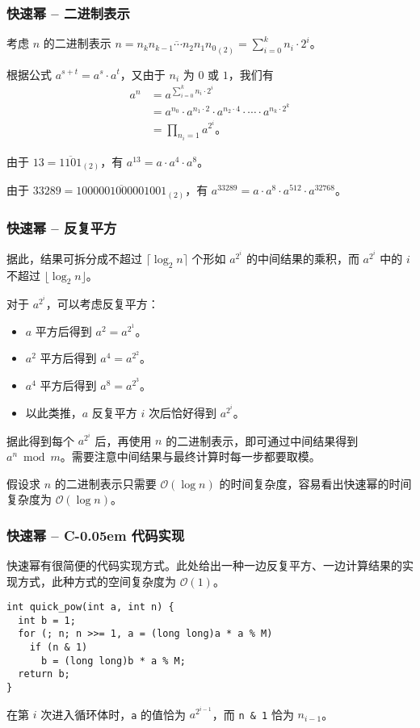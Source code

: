 \documentclass{../pkslide}
\newcommand{\Cpp}{\texorpdfstring{C\kern-0.05em\protect\raisebox{.35ex}{\textsmaller[2]{+\kern-0.05em+}}}{C++}}
\begin{document}
\begin{frame}
  \frametitle{快速幂 -- 二进制表示}
  考虑 $n$ 的二进制表示 $n = \overline{n_k n_{k - 1} \cdots n_2 n_1 n_0}_{(2)} = \sum_{i = 0}^{k} n_i \cdot 2^i$。
  
  \pause
  根据公式 $a^{s + t} = a^s \cdot a^t$，又由于 $n_i$ 为 $0$ 或 $1$，我们有
  \begin{align*}
    a^n &= a^{\sum_{i = 0}^{k} n_i \cdot 2^i} \\
    &= a^{n_0} \cdot a^{n_1 \cdot 2} \cdot a^{n_2 \cdot 4} \cdot \cdots \cdot a^{n_k \cdot 2^k} \\
    &= \prod_{n_i = 1} a^{2^i} \text{。}
  \end{align*}
  
  \pause
  \begin{example}
    由于 $13 = \overline{1101}_{(2)}$，有 $a^{13} = a \cdot a^4 \cdot a^8$。
    
    由于 $33289 = \overline{1000001000001001}_{(2)}$，有 $a^{33289} = a \cdot a^8 \cdot a^{512} \cdot a^{32768}$。
  \end{example}
\end{frame}

\begin{frame}
  \frametitle{快速幂 -- 反复平方}
  据此，结果可拆分成不超过 $\lceil \log_2 n \rceil$ 个形如 $a^{2^i}$ 的中间结果的乘积，而 $a^{2^i}$ 中的 $i$ 不超过 $\lfloor \log_2 n \rfloor$。
  
  \pause
  \emptyline
  对于 $a^{2^i}$，可以考虑反复平方：
  
  \begin{itemize}
    \item $a$ 平方后得到 $a^2 = a^{2^1}$。
    \item $a^2$ 平方后得到 $a^4 = a^{2^2}$。
    \item $a^4$ 平方后得到 $a^8 = a^{2^3}$。
    \item 以此类推，$a$ 反复平方 $i$ 次后恰好得到 $a^{2^i}$。
  \end{itemize}
  
  据此得到每个 $a^{2^i}$ 后，再使用 $n$ 的二进制表示，即可通过中间结果得到 $a^n \bmod m$。需要注意中间结果与最终计算时每一步都要取模。
  
  \pause
  假设求 $n$ 的二进制表示只需要 $\mathcal O (\log n)$ 的时间复杂度，容易看出快速幂的时间复杂度为 $\mathcal O (\log n)$。
\end{frame}

\begin{frame}[fragile]
  \frametitle{快速幂 -- \Cpp{} 代码实现}
  快速幂有很简便的代码实现方式。此处给出一种一边反复平方、一边计算结果的实现方式，此种方式的空间复杂度为 $\mathcal O (1)$。
  
\begin{verbatim}
int quick_pow(int a, int n) {
  int b = 1;
  for (; n; n >>= 1, a = (long long)a * a % M)
    if (n & 1)
      b = (long long)b * a % M;
  return b;
}
\end{verbatim}
  
  在第 $i$ 次进入循环体时，\texttt{a} 的值恰为 $a^{2^{i - 1}}$，而 \texttt{n \& 1} 恰为 $n_{i - 1}$。
\end{frame}
\end{document}
